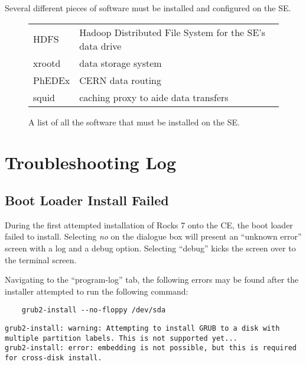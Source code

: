 \documentclass[12pt]{article}
\begin{document}
\qq Several different pieces of software must be installed and configured on the
SE.

\begin{figure}[H]
  \caption{A list of all the software that must be installed on the SE.}
  \begin{center}
    \begin{tabular}{|l|l|}
      \hline
      HDFS & Hadoop Distributed File System for the SE's data drive \\
      xrootd & data storage system\\
      PhEDEx & CERN data routing\\
      squid & caching proxy to aide data transfers\\
      \hline
    \end{tabular}
  \end{center}
\end{figure}


\newpage


\section{Troubleshooting Log}

\subsection{Boot Loader Install Failed}

\qq During the first attempted installation of Rocks 7 onto the CE, the boot
loader failed to install. Selecting \textit{no} on the dialogue box will present
an ``unknown error'' screen with a log and a debug option. Selecting ``debug''
kicks the screen over to the terminal screen.

\qq Navigating to the ``program-log'' tab, the following errors may be found
after the installer attempted to run the following command:

\begin{tcolorbox}[colback=white, colframe=black]
  \begin{verbatim}
    grub2-install --no-floppy /dev/sda
  \end{verbatim}
  \tcblower
    {\tt grub2-install: warning: Attempting to install GRUB to a disk with multiple
    partition labels. This is not supported yet...} \\
    {\tt grub2-install: error: embedding is not possible, but this is required for
    cross-disk install.}
\end{tcolorbox}
\end{document}

